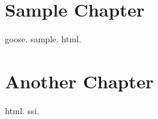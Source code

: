 \documentclass{book}
\begin{document}
\chapter{Sample Chapter}
\gls{goose}. \gls{sample}. \gls{html}.

\chapter{Another Chapter}
\gls{html}.
\gls{ssi}.

\printunsrtglossaries
\end{document}

